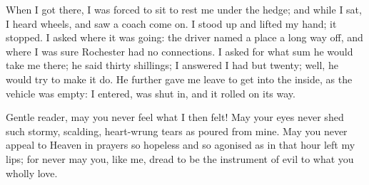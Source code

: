 When I got there, I was forced to sit to rest me under the hedge; and
while I sat, I heard wheels, and saw a coach come on. I stood up and
lifted my hand; it stopped. I asked where it was going: the driver
named a place a long way off, and where I was sure \Mr{} Rochester had no
connections. I asked for what sum he would take me there; he said
thirty shillings; I answered I had but twenty; well, he would try to
make it do. He further gave me leave to get into the inside, as the
vehicle was empty: I entered, was shut in, and it rolled on its way.

Gentle reader, may you never feel what I then felt! May your eyes never
shed such stormy, scalding, heart-wrung tears as poured from mine. May
you never appeal to Heaven in prayers so hopeless and so agonised as in
that hour left my lips; for never may you, like me, dread to be the
instrument of evil to what you wholly love.
